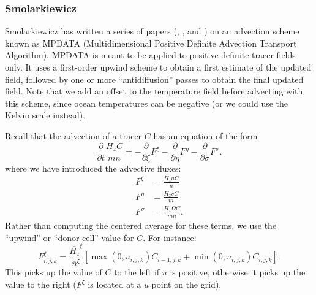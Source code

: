 \subsubsection{Smolarkiewicz}
\label{Smolark}
Smolarkiewicz has written a series of papers (\cite{Smolark83},
\cite{Smolark84}, \cite{Smolark86} and \cite{Smolark90}) on an
advection scheme known as MPDATA (Multidimensional
Positive Definite Advection Transport Algorithm).
MPDATA is meant to be applied to positive-definite tracer fields
only. It uses a first-order upwind scheme to obtain a first
estimate of the updated field, followed by one or more
``antidiffusion'' passes to obtain the final updated field.
Note that we add an offset to the temperature field before advecting
with this scheme, since ocean temperatures can be negative (or we
could use the Kelvin scale instead).

Recall that the advection of a tracer $C$ has an equation of the form
\begin{equation}
  \frac{\partial}{\partial t} \frac{ H_z C}{mn} =
  - \frac{\partial}{\partial \xi} F^\xi
  - \frac{\partial}{\partial \eta} F^\eta
  - \frac{\partial}{\partial \sigma} F^\sigma  .
\end{equation}
where we have introduced the advective fluxes:
\begin{align}
   F^\xi &= \frac{H_z u C}{n} \\
   F^\eta &= \frac{H_z v C}{m} \\
   F^\sigma &= \frac{H_z \Omega C}{mn} .
\end{align}
Rather than computing the centered average for these terms, 
we use the ``upwind'' or ``donor cell'' value for $C$. For instance:
\begin{equation}
   F^\xi_{i,j,k} = \frac{\overline{H_z}^\xi}{\overline{n}^\xi}
   \left[ \max(0,u_{i,j,k}) C_{i-1,j,k} +
   \min(0,u_{i,j,k}) C_{i,j,k} \right] .
\label{equp}
\end{equation}
This picks up the value of $C$ to the left if $u$ is positive,
otherwise it picks up the value to the right ($F^\xi$ is located at a
$u$ point on the grid).
   
